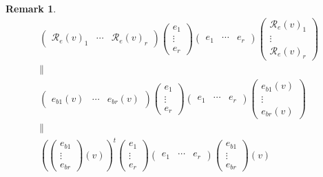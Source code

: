 \documentclass[aps,preprint]{revtex4}
\newtheorem{remark}[theorem]{Remark}
\begin{document}
\begin{remark}
\begin{gather}
\left( 
\begin{array}{ccc}
\mathcal{R}_{e}\left( v\right) _{1} & \cdots & \mathcal{R}_{e}\left(
v\right) _{r}%
\end{array}%
\right) \left( 
\begin{array}{c}
e_{1} \\ 
\vdots \\ 
e_{r}%
\end{array}%
\right) \left( 
\begin{array}{ccc}
e_{1} & \cdots & e_{r}%
\end{array}%
\right) \left( 
\begin{array}{c}
\mathcal{R}_{e}\left( v\right) _{1} \\ 
\vdots \\ 
\mathcal{R}_{e}\left( v\right) _{r}%
\end{array}%
\right) \\
\parallel \\
\left( 
\begin{array}{ccc}
e_{b1}\left( v\right) & \cdots & e_{br}\left( v\right)%
\end{array}%
\right) \left( 
\begin{array}{c}
e_{1} \\ 
\vdots \\ 
e_{r}%
\end{array}%
\right) \left( 
\begin{array}{ccc}
e_{1} & \cdots & e_{r}%
\end{array}%
\right) \left( 
\begin{array}{c}
e_{b1}\left( v\right) \\ 
\vdots \\ 
e_{br}\left( v\right)%
\end{array}%
\right) \\
\parallel \\
\left( \left( 
\begin{array}{c}
e_{b1} \\ 
\vdots \\ 
e_{br}%
\end{array}%
\right) \left( v\right) \right) ^{t}\left( 
\begin{array}{c}
e_{1} \\ 
\vdots \\ 
e_{r}%
\end{array}%
\right) \left( 
\begin{array}{ccc}
e_{1} & \cdots & e_{r}%
\end{array}%
\right) \left( 
\begin{array}{c}
e_{b1} \\ 
\vdots \\ 
e_{br}%
\end{array}%
\right) \left( v\right)
\end{gather}
\end{remark}
\end{document}
